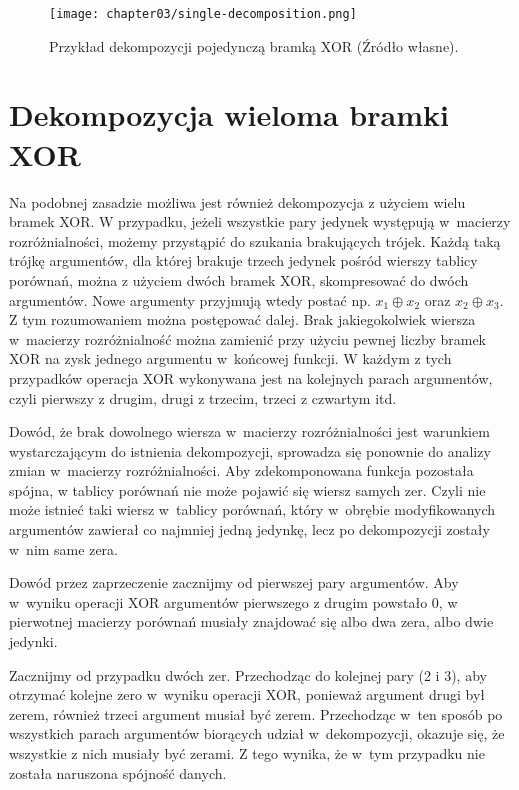 \begin{figure}[H]
\centering
\texttt{[image: chapter03/single-decomposition.png]}
\caption{Przykład dekompozycji pojedynczą bramką XOR (Źródło własne).}
\end{figure}

\section{Dekompozycja wieloma bramki XOR}

Na podobnej zasadzie możliwa jest również dekompozycja z użyciem wielu bramek XOR.
W przypadku,
jeżeli wszystkie pary jedynek występują w~macierzy rozróżnialności,
możemy przystąpić do szukania brakujących trójek.
Każdą taką trójkę argumentów,
dla której brakuje trzech jedynek pośród wierszy tablicy porównań,
można z użyciem dwóch bramek XOR,
skompresować do dwóch argumentów.
Nowe argumenty przyjmują wtedy postać np. $x_1 \oplus x_2$ oraz $x_2 \oplus x_3$.
Z tym rozumowaniem można postępować dalej.
Brak jakiegokolwiek wiersza w~macierzy rozróżnialność można zamienić przy użyciu pewnej liczby bramek XOR na zysk jednego argumentu w~końcowej funkcji.
W każdym z tych przypadków operacja XOR wykonywana jest na kolejnych parach argumentów,
czyli pierwszy z drugim,
drugi z trzecim,
trzeci z czwartym itd.

Dowód,
że brak dowolnego wiersza w~macierzy rozróżnialności jest warunkiem wystarczającym do istnienia dekompozycji,
sprowadza się ponownie do analizy zmian w~macierzy rozróżnialności.
Aby zdekomponowana funkcja pozostała spójna,
w tablicy porównań nie może pojawić się wiersz samych zer.
Czyli nie może istnieć taki wiersz w~tablicy porównań,
który w~obrębie modyfikowanych argumentów zawierał co najmniej jedną jedynkę,
lecz po dekompozycji zostały w~nim same zera.

Dowód przez zaprzeczenie zacznijmy od pierwszej pary argumentów.
Aby w~wyniku operacji XOR argumentów pierwszego z drugim powstało 0,
w pierwotnej macierzy porównań musiały znajdować się albo dwa zera,
albo dwie jedynki.

Zacznijmy od przypadku dwóch zer.
Przechodząc do kolejnej pary (2 i 3),
aby otrzymać kolejne zero w~wyniku operacji XOR,
ponieważ argument drugi był zerem,
również trzeci argument musiał być zerem.
Przechodząc w~ten sposób po wszystkich parach argumentów biorących udział w~dekompozycji,
okazuje się,
że wszystkie z nich musiały być zerami.
Z tego wynika,
że w~tym przypadku nie została naruszona spójność danych.


